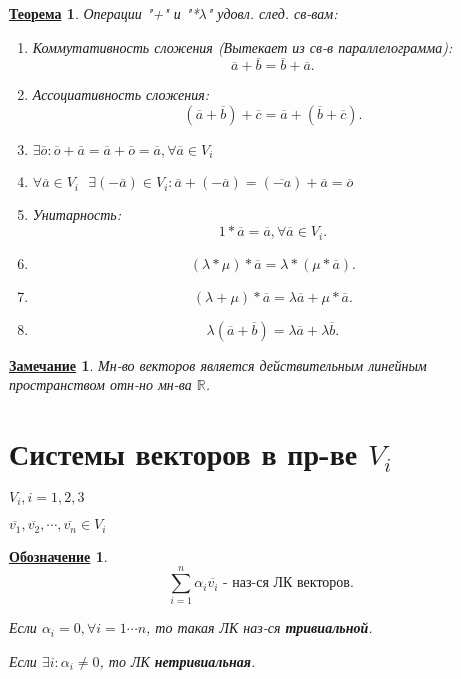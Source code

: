 \documentclass[12pt]{article}
\newcommand{\R}{\mathbb{R}}
\newtheorem{theorem}{\underline{Теорема}}[section]
\newtheorem*{note}{\underline{Замечание}}
\newtheorem*{symb}{\underline{Обозначение}}
\theoremstyle{definition}
\theoremstyle{definition}
\begin{document}
\begin{theorem}
Операции "+" и "*$\lambda$" удовл. след. св-вам:
\begin{enumerate}
    \item Коммутативность сложения (Вытекает из св-в параллелограмма):
        \[
        \overline{a} + \overline{b} = \overline{b} + \overline{a}
        .\] 
    \item Ассоциативность сложения:
        \[
            (\overline{a} + \overline{b}) + \overline{c} = \overline{a} + (\overline{b} + \overline{c})
        .\] 
    \item $\exists  \overline{o} \colon  \overline{o} + \overline{a} = \overline{a} + \overline{o} = \overline{a}, \forall \overline{a}  \in V_i$
    \item $\forall \overline{a}  \in V_i \text{ }\exists (-\overline{a})  \in V_i \colon \overline{a} + (-\overline{a}) = (\overline{-a}) + \overline{a} = \overline{o}$
    \item Унитарность:
        \[
        1 * \overline{a} = \overline{a}, \forall \overline{a}  \in V_i
        .\] 
    \item \[
            (\lambda * \mu) * \overline{a} = \lambda * (\mu * \overline{a})
    .\] 
\item \[
        (\lambda + \mu) * \overline{a} = \lambda \overline{a} + \mu * \overline{a}
.\] 
\item \[
\lambda(\overline{a} + \overline{b}) = \lambda \overline{a} + \lambda \overline{b}
.\]  
\end{enumerate}
\end{theorem}
\begin{note}
Мн-во векторов является действительным линейным пространством отн-но мн-ва $\R$.
\end{note}

\section{Системы векторов в пр-ве $V_i$}
$ V_i, i = 1, 2, 3$ 

$\overline{v_1}, \overline{v_2}, \cdots, \overline{v_n}  \in V_i$ 

\begin{symb}
    \[
    \sum_{i = 1}^{n}  \alpha_i \overline{v_i} \text{ - наз-ся ЛК векторов}
    .\] 

    Если $\alpha_i = 0, \forall i=1\cdots n$, то такая ЛК наз-ся \textbf{тривиальной}.

    Если $\exists i \colon  \alpha_i \neq 0$, то ЛК \textbf{нетривиальная}.
\end{symb}
\end{document}
